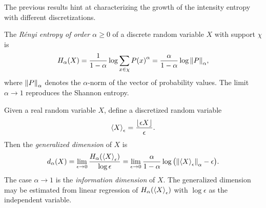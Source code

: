 \documentclass[../notebook.tex]{subfiles}
\begin{document}

The previous results hint at characterizing the growth of the intensity entropy
with different discretizations.

\begin{defn}
  The \emph{R\'enyi entropy of order $\alpha \ge 0$} of a discrete random
  variable $X$ with support $\chi$ is
  \begin{equation}
    H_\alpha(X)
    = \frac{1}{1 - \alpha}\operatorname{\mathrm{log}}\sum_{x \in \chi} {P(x)}^\alpha
    = \frac{\alpha}{1 - \alpha}\operatorname{\mathrm{log}}\norm{P}_\alpha,
    \label{eq:renyi}
  \end{equation}
  where $\norm{P}_\alpha$ denotes the $\alpha$-norm of the vector of probability
  values. The limit $\alpha \to 1$ reproduces the Shannon entropy.
\end{defn}

\begin{defn}
  Given a real random variable $X$, define a discretized random variable
  \[
    \ev{X}_\epsilon
    = \frac{\lfloor\epsilon X\rfloor}{\epsilon}.
  \]
  Then the \emph{generalized dimension} of $X$ is
  \begin{equation}
    d_\alpha(X)
    = \lim_{\epsilon \to 0} \frac{H_\alpha(\ev{X}_\epsilon)}{\log \epsilon}
    = \lim_{\epsilon \to 0} \frac{\alpha}{1 - \alpha}
    \log\qty(\norm{\ev{X}_\epsilon}_\alpha - \epsilon).
    \label{eq:gendim}
  \end{equation}
  The case $\alpha \to 1$ is the \emph{information dimension} of $X$. The
  generalized dimension may be estimated from linear regression of
  $H_\alpha(\ev{X}_\epsilon)$ with $\log\epsilon$ as the independent variable.
\end{defn}


\end{document}
